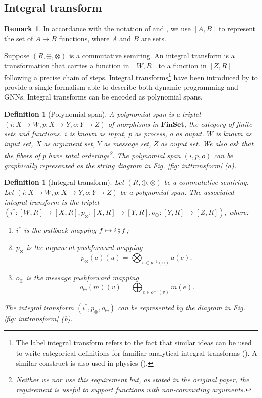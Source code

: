 \documentclass[11pt,a4paper,openright,twoside]{report}
\newcounter{mycounter}
\theoremstyle{plain}
\newtheorem{definition}[mycounter]{Definition}
\theoremstyle{definition}
\newtheorem{remark}[mycounter]{Remark}
\begin{document}
\subsection{Integral transform}

\begin{remark}
  In accordance with the notation of \cite{dudzik2022graph} and \cite{dudzik2024asynchronous}, we use $[A,B]$ to represent the set of $A \to B$ functions, where $A$ and $B$ are sets.
\end{remark}

Suppose $(R, \oplus, \otimes)$ is a commutative semiring. An integral transform is a transformation that carries a function in $[W,R]$ to a function in $[Z,R]$ following a precise chain of steps. Integral transforms\footnote{The label integral transform refers to the fact that similar ideas can be used to write categorical definitions for familiar analytical integral transforms (\cite{golem_ph_utexas_edu}). A similar construct is also used in physics (\cite{eastwood1980cohomology}).} have been introduced by \cite{dudzik2022graph} to provide a single formalism able to describe both dynamic programming and GNNs. Integral transforms can be encoded as polynomial spans.

\begin{definition}[Polynomial span]
  A polynomial span is a triplet $(i: X \to W,p: X \to Y,o: Y \to Z)$ of morphisms in $\mathbf{FinSet}$, the category of finite sets and functions. $i$ is known as input, $p$ as process, $o$ as ouput. $W$ is known as input set, $X$ as argument set, $Y$ as message set, $Z$ as ouput set. We also ask that the fibers of $p$ have total orderings\footnote{Neither we nor \cite{dudzik2022graph} use this requirement but, as stated in the original paper, the requirement is useful to support functions with non-commuting arguments.}. The polynomial span $(i,p,o)$ can be graphically represented as the string diagram in \textit{Fig. \ref{fig: inttransform} (a)}.
\end{definition}

\begin{definition}[Integral transform]
  Let $(R, \oplus, \otimes)$ be a commutative semiring. Let $(i: X \to W,p: X \to Y,o: Y \to Z)$ be a polynomial span. The associated integral transform is the triplet $(i^*: [W,R] \to [X,R], p_{\otimes}: [X,R] \to [Y,R], o_{\oplus}: [Y,R] \to [Z,R])$, where:
  \begin{enumerate}
    \item $i^*$ is the pullback mapping $f \mapsto i \fatsemi f$;
    \item $p_{\otimes}$ is the argument pushforward mapping 
    \[p_{\otimes}(a)(u) = \bigotimes_{e \in p^{-1}(u)}a(e);\]
    \item $o_{\otimes}$ is the message pushforward mapping 
    \[o_{\oplus}(m)(v) = \bigoplus_{e \in o^{-1}(v)}m(e).\]
  \end{enumerate}
  The integral transform $(i^*, p_{\otimes}, o_{\oplus})$ can be represented by the diagram in \textit{Fig. \ref{fig: inttransform} (b)}.
\end{definition}
\end{document}
